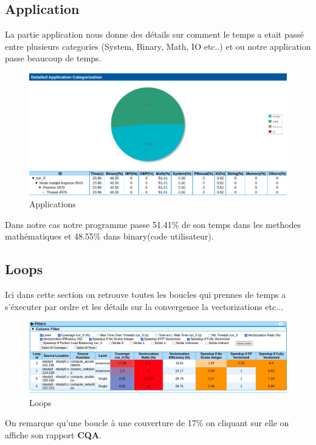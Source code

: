 \documentclass[11pt,a4paper,onecolumn,openright,oneside]{report}
\begin{document}
\subsection{Application}

La partie application nous donne des détails sur comment le temps a etait passé entre plusieurs categories (System, Binary, Math, IO etc..) et ou notre application passe beaucoup de temps.

\begin{figure}[H]
    \centering
    \includegraphics[scale=0.4]{Images/1/Application.png}
    \caption{Applications}
    \label{fig:my_label}
\end{figure}
Dans notre cas notre programme passe 51.41\% de son temps dans les methodes mathématiques et 48.55\% dans binary(code utilisateur).

\subsection{Loops}
Ici dans cette section on retrouve toutes les boucles qui prennes de temps a s'éxecuter par ordre et les détails sur la convergence la vectorizations etc...
\begin{figure}[H]
    \centering
    \includegraphics[scale=0.37]{Images/1/loops.png}
    \caption{Loops}
    \label{fig:my_label}
\end{figure}

On remarque  qu'une boucle à une couverture de 17\% on cliquant sur elle on affiche son rapport \textbf{CQA}.
\end{document}
